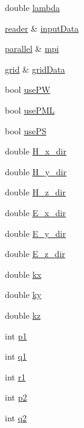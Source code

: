 \begin{DoxyCompactItemize}
double \hyperlink{classmaxwell_a7176d5bb9b188561e08c61f48619849f}{lambda}
\item 
\hyperlink{classreader}{reader} \& \hyperlink{classmaxwell_a2f4ac38793fe9e80ec26448e631ba69d}{input\+Data}
\item 
\hyperlink{classparallel}{parallel} \& \hyperlink{classmaxwell_a9b16bad0e1e47ea794adbc3fee740c64}{mpi}
\item 
\hyperlink{classgrid}{grid} \& \hyperlink{classmaxwell_a9c6323aba3021f162ada73b5e06366f9}{grid\+Data}
\item 
bool \hyperlink{classmaxwell_a356235214e2e5843d2ffe2c8e4214ef8}{use\+PW}
\item 
bool \hyperlink{classmaxwell_aebb8131bb77131dd7f4ce25b0b18ecf9}{use\+P\+ML}
\item 
bool \hyperlink{classmaxwell_a2c66ad55c831f87be4243ec2acace958}{use\+PS}
\item 
double \hyperlink{classmaxwell_abfa28d79b45ce7c3b9a45c97903057a2}{H\+\_\+x\+\_\+dir}
\item 
double \hyperlink{classmaxwell_a6f1cefe8572a9f1aa0df33734f88c183}{H\+\_\+y\+\_\+dir}
\item 
double \hyperlink{classmaxwell_a3595ede96fdacc0631c3690941138a5e}{H\+\_\+z\+\_\+dir}
\item 
double \hyperlink{classmaxwell_a3a15355bece22428006a6278bdc48c6b}{E\+\_\+x\+\_\+dir}
\item 
double \hyperlink{classmaxwell_a124006b4e0392e25aa4f2710e6ef5d9a}{E\+\_\+y\+\_\+dir}
\item 
double \hyperlink{classmaxwell_a91434ccd5f753f95e3d0d9f7dcb7c5da}{E\+\_\+z\+\_\+dir}
\item 
double \hyperlink{classmaxwell_a11e3a7a18b4ea7a1cd560d5316f22395}{kx}
\item 
double \hyperlink{classmaxwell_a7784a4aad4a4cd36311f2583ec64f8b0}{ky}
\item 
double \hyperlink{classmaxwell_a5bd91522e0be939fdb2c36c909dd01c4}{kz}
\item 
int \hyperlink{classmaxwell_ae44e53ed3db3e794c86b1ee2ed45e618}{p1}
\item 
int \hyperlink{classmaxwell_af6c514d210b2c78825dca5ffeacace6c}{q1}
\item 
int \hyperlink{classmaxwell_ab07e9e4e8a20cc8589b2a571ba71d528}{r1}
\item 
int \hyperlink{classmaxwell_abde91396e5a8882df43725baca204d7d}{p2}
\item 
int \hyperlink{classmaxwell_a35b17d1913c5aff045695fb688525115}{q2}

\end{DoxyCompactItemize}
